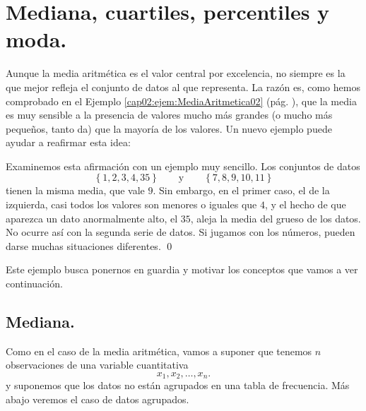 \section{Mediana, cuartiles, percentiles y moda.}
\label{cap02:sec:MedianaCuartilesPercentilesModa}

Aunque la media aritmética es el valor central por excelencia, no siempre es la
que mejor refleja el conjunto de datos al que representa. La razón es, como hemos comprobado en el Ejemplo \ref{cap02:ejem:MediaAritmetica02} (pág. \pageref{cap02:ejem:MediaAritmetica02}), que la media es muy sensible a la presencia de valores mucho más grandes (o mucho más pequeños, tanto da) que la mayoría de los valores. Un nuevo ejemplo puede ayudar a reafirmar esta idea:
\begin{ejemplo}
\label{cap02:ejem:MediaConAtipicos}
Examinemos esta afirmación con un ejemplo muy sencillo. Los conjuntos de datos
	\[\left\{1,2,3,4,35\right\}\qquad \mbox{y} \qquad \left\{7,8,9,10,11\right\}\]
tienen la misma media, que vale $9$. Sin embargo, en el primer caso, el de la
izquierda, casi todos los valores son menores o iguales que $4$, y el hecho de
que aparezca un dato anormalmente alto, el $35$, aleja la media del grueso de
los datos. No ocurre así con la segunda serie de datos. Si jugamos con los
n\'umeros, pueden darse muchas situaciones diferentes.
\qed
\end{ejemplo}
Este ejemplo busca ponernos en guardia y motivar los conceptos que vamos a ver
continuación.




\subsection{Mediana.}
\label{cap02:subsec:Mediana}

Como en el caso de la media aritmética, vamos a suponer que tenemos $n$
observaciones de una variable cuantitativa
    \[x_1,x_2,\ldots,x_n.\]
y suponemos que los datos no están agrupados en una tabla de frecuencia. Más
abajo veremos el caso de datos agrupados.


